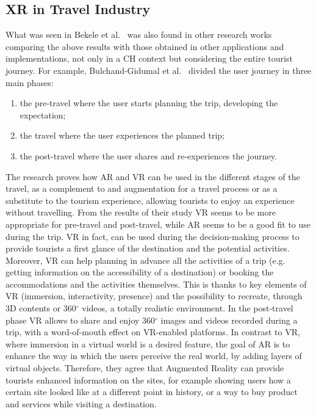 \subsection{XR in Travel Industry}
What was seen in Bekele et al.~\cite{bekele_survey_2018} was also found in other research works comparing the above results with those obtained in other applications and implementations, not only in a CH context but considering the entire tourist journey. For example, Bulchand-Gidumal et al.~\cite{bulchand-gidumal_tourists_2020} divided the user journey in three main phases:
\begin{enumerate}
	\item the pre-travel where the user starts planning the trip, developing the expectation;
	\item the travel where the user experiences the planned trip;
	\item the post-travel where the user shares and re-experiences the journey.
\end{enumerate}

The research proves how AR and VR can be used in the different stages of the travel, as a complement to and augmentation for a travel process or as a substitute to the tourism experience, allowing tourists to enjoy an experience without travelling. From the results of their study VR seems to be more appropriate for pre-travel and post-travel, while AR seems to be a good fit to use during the trip. VR in fact, can be used during the decision-making process to provide tourists a first glance of the destination and the potential activities. Moreover, VR can help planning in advance all the activities of a trip (e.g. getting information on the accessibility of a destination) or booking the accommodations and the activities themselves. This is thanks to key elements of VR (immersion, interactivity, presence) and the possibility to recreate, through 3D contents or 360$^{\circ}$ videos, a totally realistic environment. 
In the post-travel phase VR allows to share and enjoy 360$^{\circ}$ images and videos recorded during a trip, with a word-of-mouth effect on VR-enabled platforms.
In contrast to VR, where immersion in a virtual world is a desired feature, the goal of AR is to enhance the way in which the users perceive the real world, by adding layers of virtual objects. Therefore, they agree that Augmented Reality can provide tourists enhanced information on the sites, for example showing users how a certain site looked like at a different point in history, or a way to buy product and services while visiting a destination.

